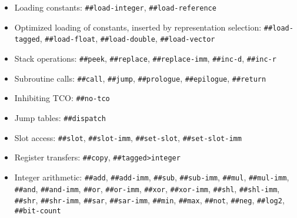 \begin{itemize}
\item
\begin{flushleft}
Loading constants:
\Verb|##load-integer|,
\Verb|##load-reference|
\end{flushleft}

\item
\begin{flushleft}
Optimized loading of constants, inserted by representation selection:
\Verb|##load-tagged|,
\Verb|##load-float|,
\Verb|##load-double|,
\Verb|##load-vector|
\end{flushleft}

\item
\begin{flushleft}
Stack operations:
\Verb|##peek|,
\Verb|##replace|,
\Verb|##replace-imm|,
\Verb|##inc-d|,
\Verb|##inc-r|
\end{flushleft}

\item
\begin{flushleft}
Subroutine calls:
\Verb|##call|,
\Verb|##jump|,
\Verb|##prologue|,
\Verb|##epilogue|,
\Verb|##return|
\end{flushleft}

\item
\begin{flushleft}
Inhibiting \gls{TCO}:
\Verb|##no-tco|
\end{flushleft}

\item
\begin{flushleft}
Jump tables:
\Verb|##dispatch|
\end{flushleft}

\item
\begin{flushleft}
Slot access:
\Verb|##slot|,
\Verb|##slot-imm|,
\Verb|##set-slot|,
\Verb|##set-slot-imm|
\end{flushleft}

\item
\begin{flushleft}
Register transfers:
\Verb|##copy|,
\Verb|##tagged>integer|
\end{flushleft}

\item
\begin{flushleft}
Integer arithmetic:
\Verb|##add|,
\Verb|##add-imm|,
\Verb|##sub|,
\Verb|##sub-imm|,
\Verb|##mul|,
\Verb|##mul-imm|,
\Verb|##and|,
\Verb|##and-imm|,
\Verb|##or|,
\Verb|##or-imm|,
\Verb|##xor|,
\Verb|##xor-imm|,
\Verb|##shl|,
\Verb|##shl-imm|,
\Verb|##shr|,
\Verb|##shr-imm|,
\Verb|##sar|,
\Verb|##sar-imm|,
\Verb|##min|,
\Verb|##max|,
\Verb|##not|,
\Verb|##neg|,
\Verb|##log2|,
\Verb|##bit-count|
\end{flushleft}


\end{itemize}
